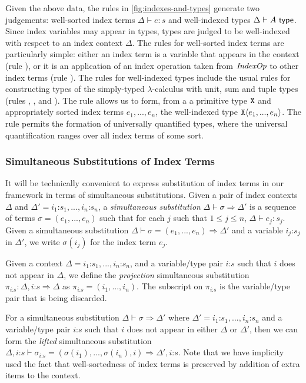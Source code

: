 Given the above data, the rules in \autoref{fig:indexes-and-types}
generate two judgements: well-sorted index terms $\Delta \vdash e : s$
and well-indexed types $\Delta \vdash A \textsf{ type}$. Since index
variables may appear in types, types are judged to be well-indexed
with respect to an index context $\Delta$. The rules for well-sorted
index terms are particularly simple: either an index term is a
variable that appears in the context (rule ), or it is
an application of an index operation taken from $\mathit{IndexOp}$ to other
index terms (rule ). The rules for well-indexed types
include the usual rules for constructing types of the simply-typed
$\lambda$-calculus with unit, sum and tuple types (rules
, ,  and
). The rule  allows us to form, from a
a primitive type $\texttt{X}$ and appropriately sorted index terms
$e_1,...,e_n$, the well-indexed type $\texttt{X}\langle e_1,...,e_n \rangle$. The
rule  permits the formation of universally
quantified types, where the universal quantification ranges over all
index terms of some sort.

\subsubsection{Simultaneous Substitutions of Index Terms}
\label{sec:simultaneous-substitution}

It will be technically convenient to express substitution of index
terms in our framework in terms of simultaneous substitutions.  Given
a pair of index contexts $\Delta$ and $\Delta' = i_1 \mathord: s_1,
..., i_n \mathord: s_n$, a \emph{simultaneous substitution} $\Delta
\vdash \sigma \Rightarrow \Delta'$ is a sequence of terms $\sigma =
(e_1,...,e_n)$ such that for each $j$ such that $1 \leq j \leq n$,
$\Delta \vdash e_j : s_j$. Given a simultaneous substitution $\Delta
\vdash \sigma = (e_1,...,e_n) \Rightarrow \Delta'$ and a variable $i_j
\mathord: s_j$ in $\Delta'$, we write $\sigma(i_j)$ for the index term
$e_j$.

Given a context $\Delta = i_1\mathord:s_1,...,i_n\mathord:s_n$, and a
variable/type pair $i\mathord:s$ such that $i$ does not appear in
$\Delta$, we define the \emph{projection} simultaneous substitution
$\pi_{i\mathord:s} : \Delta,i\mathord:s \Rightarrow \Delta$ as
$\pi_{i\mathord:s} = (i_1,...,i_n)$. The subscript on
$\pi_{i\mathord:s}$ is the variable/type pair that is being discarded.

For a simultaneous substitution $\Delta \vdash \sigma \Rightarrow
\Delta'$ where $\Delta' = i_1\mathord:s_1,...,i_n\mathord:s_n$ and a
variable/type pair $i\mathord:s$ such that $i$ does not appear in
either $\Delta$ or $\Delta'$, then we can form the \emph{lifted}
simultaneous substitution $\Delta,i\mathord:s \vdash
\sigma_{i\mathord:s} = (\sigma(i_1), ..., \sigma(i_n), i) \Rightarrow
\Delta',i\mathord:s$. Note that we have implicity used the fact that
well-sortedness of index terms is preserved by addition of extra items
to the context.

